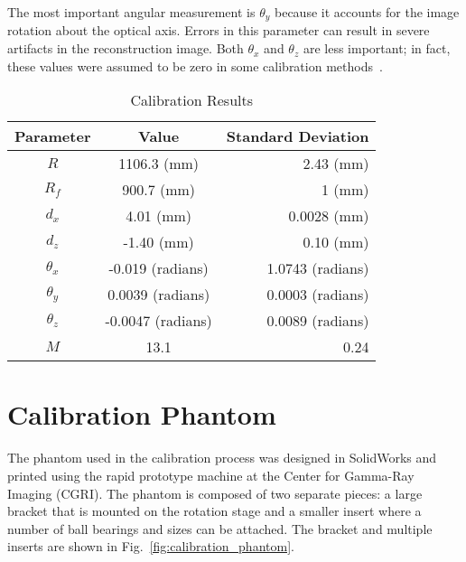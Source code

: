 The most important angular measurement is $\theta_y$ because it accounts for the image rotation about the optical axis.  Errors in this parameter can result in severe artifacts in the reconstruction image.  Both $\theta_x$ and $\theta_z$ are less important; in fact, these values were assumed to be zero in some calibration methods~\citep{Noo2000, Cho2005, Yang2006}.  
%
\begin{center}
	\begin{table}[ht]\caption{Calibration Results}
		\begin{tabular}{c | c | r}
		\hline
		Parameter &	Value & Standard Deviation \\ \hline \hline
		$R$ & 1106.3 (mm) & 2.43 (mm)\\ \hline
		$R_f$ & 900.7 (mm)&  1 (mm) \\ \hline
		$d_x$ & 4.01 (mm)& 0.0028 (mm)\\ \hline
		$d_z$ & -1.40 (mm)& 0.10 (mm)\\ \hline
		$\theta_x$ & -0.019 (radians)& 1.0743 (radians)\\ \hline
		$\theta_y$ & 0.0039 (radians)& 0.0003 (radians)\\ \hline
		$\theta_z$ & -0.0047 (radians)& 0.0089 (radians)\\ \hline	
		$M$ & 13.1 & 0.24 \\ \hline
		\end{tabular}
	\end{table}
	\label{table:calibration_result}
\end{center}

\section{Calibration Phantom}
The phantom used in the calibration process was designed in SolidWorks and printed using the rapid prototype machine at the Center for Gamma-Ray Imaging (CGRI).  The phantom is composed of two separate pieces: a large bracket that is mounted on the rotation stage and a smaller insert where a number of ball bearings and sizes can be attached.  The bracket and multiple inserts are shown in Fig.~\ref{fig:calibration_phantom}.

